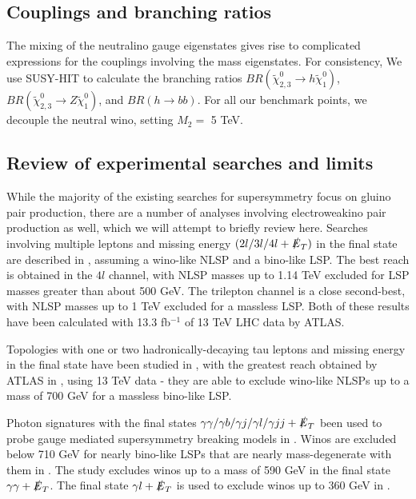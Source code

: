 \subsection{Couplings and branching ratios}

The mixing of the neutralino gauge eigenstates gives rise to complicated expressions for the couplings involving the mass eigenstates. For consistency, We use SUSY-HIT to calculate the branching ratios $BR(\widetilde{\chi}_{2,3}^0\rightarrow h\widetilde{\chi}_1^0)$,$BR(\widetilde{\chi}_{2,3}^0\rightarrow Z\widetilde{\chi}_1^0)$, and $BR(h\rightarrow bb)$. For all our benchmark points, we decouple the neutral wino, setting $M_2 = $ 5 TeV.

\subsection{Review of experimental searches and limits}

While the majority of the existing searches for supersymmetry focus on gluino pair production, there are a number of analyses involving electroweakino pair production as well, which we will attempt to briefly review here. 
Searches involving multiple leptons and missing energy $(2l/3l/4l +\slashed{E}_T)$ in the final state are described in \citep{ATLAS:2016uwq,ATLAS:2016soo,Khachatryan:2014qwa,Chatrchyan:2012pka}, assuming a wino-like NLSP and a bino-like LSP. The best reach is obtained in the $4l$ channel, with NLSP masses up to 1.14 TeV excluded for LSP masses greater than about 500 GeV. The trilepton channel is a close second-best, with NLSP masses up to 1 TeV excluded for a massless LSP. Both of these results have been calculated with 13.3 fb$^{-1}$ of 13 TeV LHC data by ATLAS. 

Topologies with one or two hadronically-decaying tau leptons and missing energy in the final state have been studied in \citep{ATLAS:2016ety,Khachatryan:2016trj}, with the greatest reach obtained by ATLAS in \citep{ATLAS:2016ety}, using 13 TeV data - they are able to exclude wino-like NLSPs up to a mass of 700 GeV for a massless bino-like LSP. 

Photon signatures with the final states $\gamma\gamma/\gamma b/\gamma j/\gamma l/\gamma j j + \slashed{E}_T$ been used to probe gauge mediated supersymmetry breaking  models in \citep{Chatrchyan:2012bba,CMS:2015loa,Aad:2015hea,Khachatryan:2015exa,Khachatryan:2016hns}. Winos are excluded below 710 GeV for nearly bino-like LSPs that are nearly mass-degenerate with them in \citep{Khachatryan:2016hns}. The study \cite{Aad:2015hea} excludes winos up to a mass of 590 GeV in the final state $\gamma\gamma + \slashed{E}_T$.  The final state $\gamma l + \slashed{E}_T$ is used to exclude winos up to 360 GeV in \citep{CMS:2015loa}. 

